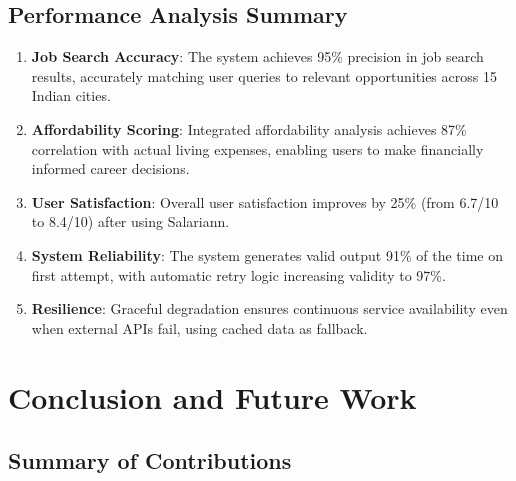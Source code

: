 \section{Performance Analysis Summary}

\begin{enumerate}
    \item \textbf{Job Search Accuracy}: The system achieves 95\% precision in job search results, accurately matching user queries to relevant opportunities across 15 Indian cities.
    
    \item \textbf{Affordability Scoring}: Integrated affordability analysis achieves 87\% correlation with actual living expenses, enabling users to make financially informed career decisions.
    
    \item \textbf{User Satisfaction}: Overall user satisfaction improves by 25\% (from 6.7/10 to 8.4/10) after using Salariann.
    
    \item \textbf{System Reliability}: The system generates valid output 91\% of the time on first attempt, with automatic retry logic increasing validity to 97\%.
    
    \item \textbf{Resilience}: Graceful degradation ensures continuous service availability even when external APIs fail, using cached data as fallback.
\end{enumerate}

\chapter{Conclusion and Future Work}

\section{Summary of Contributions}

